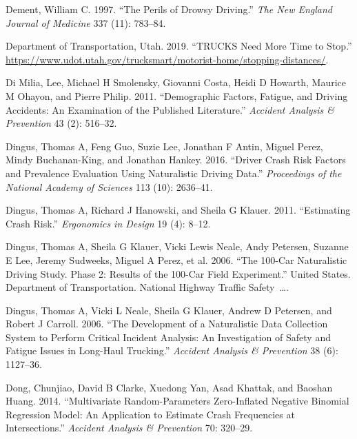 \documentclass[12pt]{book}
\numberwithin{equation}{chapter}
\begin{document}
\leavevmode\hypertarget{ref-dement1997perils}{}%
Dement, William C. 1997. ``The Perils of Drowsy Driving.'' \emph{The New England Journal of Medicine} 337 (11): 783--84.

\leavevmode\hypertarget{ref-utah2019}{}%
Department of Transportation, Utah. 2019. ``TRUCKS Need More Time to Stop.'' \url{https://www.udot.utah.gov/trucksmart/motorist-home/stopping-distances/}.

\leavevmode\hypertarget{ref-di2011demographic}{}%
Di Milia, Lee, Michael H Smolensky, Giovanni Costa, Heidi D Howarth, Maurice M Ohayon, and Pierre Philip. 2011. ``Demographic Factors, Fatigue, and Driving Accidents: An Examination of the Published Literature.'' \emph{Accident Analysis \& Prevention} 43 (2): 516--32.

\leavevmode\hypertarget{ref-dingus2016driver}{}%
Dingus, Thomas A, Feng Guo, Suzie Lee, Jonathan F Antin, Miguel Perez, Mindy Buchanan-King, and Jonathan Hankey. 2016. ``Driver Crash Risk Factors and Prevalence Evaluation Using Naturalistic Driving Data.'' \emph{Proceedings of the National Academy of Sciences} 113 (10): 2636--41.

\leavevmode\hypertarget{ref-dingus2011estimating}{}%
Dingus, Thomas A, Richard J Hanowski, and Sheila G Klauer. 2011. ``Estimating Crash Risk.'' \emph{Ergonomics in Design} 19 (4): 8--12.

\leavevmode\hypertarget{ref-dingus2006100}{}%
Dingus, Thomas A, Sheila G Klauer, Vicki Lewis Neale, Andy Petersen, Suzanne E Lee, Jeremy Sudweeks, Miguel A Perez, et al. 2006. ``The 100-Car Naturalistic Driving Study. Phase 2: Results of the 100-Car Field Experiment.'' United States. Department of Transportation. National Highway Traffic Safety~\ldots{}.

\leavevmode\hypertarget{ref-dingus2006development}{}%
Dingus, Thomas A, Vicki L Neale, Sheila G Klauer, Andrew D Petersen, and Robert J Carroll. 2006. ``The Development of a Naturalistic Data Collection System to Perform Critical Incident Analysis: An Investigation of Safety and Fatigue Issues in Long-Haul Trucking.'' \emph{Accident Analysis \& Prevention} 38 (6): 1127--36.

\leavevmode\hypertarget{ref-dong2014multivariate}{}%
Dong, Chunjiao, David B Clarke, Xuedong Yan, Asad Khattak, and Baoshan Huang. 2014. ``Multivariate Random-Parameters Zero-Inflated Negative Binomial Regression Model: An Application to Estimate Crash Frequencies at Intersections.'' \emph{Accident Analysis \& Prevention} 70: 320--29.
\end{document}
